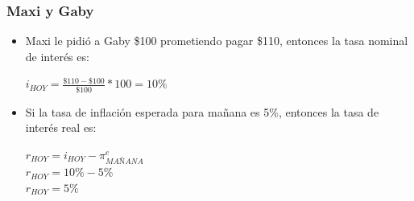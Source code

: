\documentclass{beamer}
\begin{document}
\begin{frame}
\frametitle{Maxi y Gaby}
\begin{itemize}
    \item Maxi le pidió a Gaby \$100 prometiendo pagar \$110, entonces la tasa nominal de interés es:
    \vspace{2mm}
    \begin{center}
        $i_{HOY}=\frac{\$110 - \$100}{\$100} * 100 = 10\%$
    \end{center}
        \vspace{2mm}
    \item Si la tasa de inflación esperada para mañana es 5\%, entonces la tasa de interés real es: \\
    \begin{center}
        $r_{HOY} = i_{HOY}-\pi_{MAÑANA}^e$ \\
        \vspace{2mm}
        $r_{HOY} = 10\%-5\% $ \\
        \vspace{2mm}
        $r_{HOY} = 5\%$
    \end{center}
\end{itemize}
\end{frame}
\end{document}
